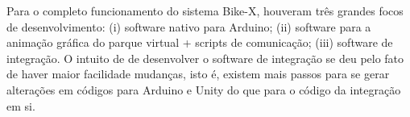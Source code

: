 Para o completo funcionamento do sistema Bike-X, houveram três grandes focos de desenvolvimento: (i) software nativo para Arduino; (ii) software para a animação gráfica do parque virtual + scripts de comunicação; (iii) software de integração. O intuito de de desenvolver o software de integração se deu pelo fato de haver maior facilidade mudanças, isto é, existem mais passos para se gerar alterações em códigos para Arduino e Unity do que para o código da integração em si. 